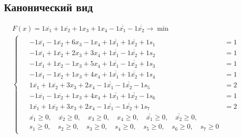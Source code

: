 \subsection*{Канонический вид}
\begin{equation}
\begin{matrix}
    F(x) = 1\overline{x_1} + 1\overline{x_2} + 1x_3 + 1x_4 -1\overline{\overline{x_1}} -1\overline{\overline{x_2}} \to \min \\
    \begin{cases}
    \begin{aligned}
        & -1\overline{x_1} -1\overline{x_2} + 6x_3 -1x_4 + 1\overline{\overline{x_1}} + 1\overline{\overline{x_2}} + 1s_1 & = 1 \\
        & -1\overline{x_1} + 1\overline{x_2} + 2x_3 + 3x_4 + 1\overline{\overline{x_1}} -1\overline{\overline{x_2}} + 1s_2 & = 1 \\
        & -1\overline{x_1} + 1\overline{x_2} -1x_3 + 5x_4 + 1\overline{\overline{x_1}} -1\overline{\overline{x_2}} + 1s_3 & = 1 \\
        & -1\overline{x_1} -1\overline{x_2} + 1x_3 + 4x_4 + 1\overline{\overline{x_1}} + 1\overline{\overline{x_2}} + 1s_4 & = 1 \\
        & 1\overline{x_1} + 1\overline{x_2} + 3x_3 + 2x_4 -1\overline{\overline{x_1}} -1\overline{\overline{x_2}} -1s_5 & = 2 \\
        & -1\overline{x_1} -1\overline{x_2} + 1x_3 + 4x_4 + 1\overline{\overline{x_1}} + 1\overline{\overline{x_2}} -1s_6 & = 1 \\
        & 1\overline{x_1} + 1\overline{x_2} + 3x_3 + 2x_4 -1\overline{\overline{x_1}} -1\overline{\overline{x_2}} + 1s_7 & = 2 \\
        & \overline{x_1} \geq 0, \quad \overline{x_2} \geq 0, \quad x_3 \geq 0, \quad x_4 \geq 0, \quad \overline{\overline{x_1}} \geq 0, \quad \overline{\overline{x_2}} \geq 0, \\
        &  s_1 \geq 0, \quad s_2 \geq 0, \quad s_3 \geq 0, \quad s_4 \geq 0, \quad s_5 \geq 0, \quad s_6 \geq 0, \quad s_7 \geq 0
    \end{aligned}
    \end{cases}
\end{matrix}
\end{equation}




